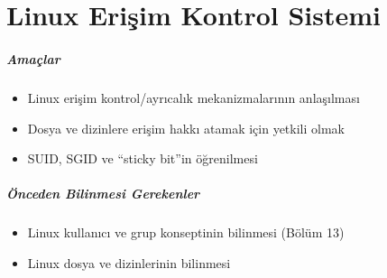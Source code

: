 \chapter{Linux Erişim Kontrol Sistemi}
\paragraph{Amaçlar}{
\begin{itemize}
 \item Linux erişim kontrol/ayrıcalık mekanizmalarının anlaşılması
 \item Dosya ve dizinlere erişim hakkı atamak için yetkili olmak
 \item SUID, SGID ve “sticky bit”in öğrenilmesi
 \end{itemize}}
\paragraph{Önceden Bilinmesi Gerekenler}
\begin{itemize}
 \item Linux kullanıcı ve grup konseptinin bilinmesi (Bölüm 13)
 \item Linux dosya ve dizinlerinin bilinmesi
 \end{itemize}

